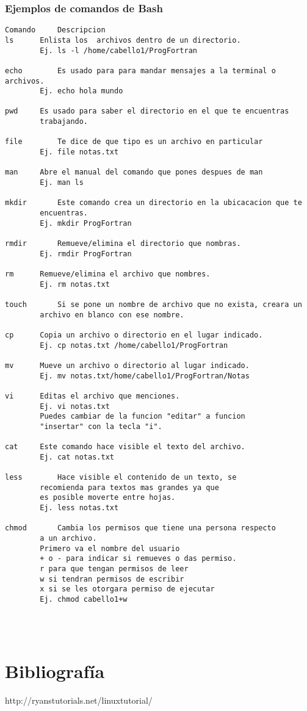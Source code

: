 \documentclass{article}
\begin{document}
\subsubsection{Ejemplos de comandos de Bash}
\begin{verbatim}
Comando		Descripcion
ls		Enlista los  archivos dentro de un directorio.
		Ej. ls -l /home/cabello1/ProgFortran

echo		Es usado para para mandar mensajes a la terminal o archivos.
		Ej. echo hola mundo

pwd		Es usado para saber el directorio en el que te encuentras
		trabajando.

file		Te dice de que tipo es un archivo en particular
		Ej. file notas.txt

man		Abre el manual del comando que pones despues de man
		Ej. man ls

mkdir		Este comando crea un directorio en la ubicacacion que te
		encuentras.
		Ej. mkdir ProgFortran

rmdir		Remueve/elimina el directorio que nombras.
		Ej. rmdir ProgFortran

rm		Remueve/elimina el archivo que nombres.
		Ej. rm notas.txt

touch		Si se pone un nombre de archivo que no exista, creara un
		archivo en blanco con ese nombre.

cp		Copia un archivo o directorio en el lugar indicado.
		Ej. cp notas.txt /home/cabello1/ProgFortran

mv		Mueve un archivo o directorio al lugar indicado.
		Ej. mv notas.txt/home/cabello1/ProgFortran/Notas

vi		Editas el archivo que menciones.
		Ej. vi notas.txt
		Puedes cambiar de la funcion "editar" a funcion
		"insertar" con la tecla "i".

cat		Este comando hace visible el texto del archivo.
		Ej. cat notas.txt

less		Hace visible el contenido de un texto, se
		recomienda para textos mas grandes ya que
		es posible moverte entre hojas.
		Ej. less notas.txt

chmod		Cambia los permisos que tiene una persona respecto
		a un archivo.
		Primero va el nombre del usuario
		+ o - para indicar si remueves o das permiso.
		r para que tengan permisos de leer
		w si tendran permisos de escribir
		x si se les otorgara permiso de ejecutar
		Ej. chmod cabello1+w

		
		

\end{verbatim}
\section{Bibliografía}
http://ryanstutorials.net/linuxtutorial/
\end{document}

